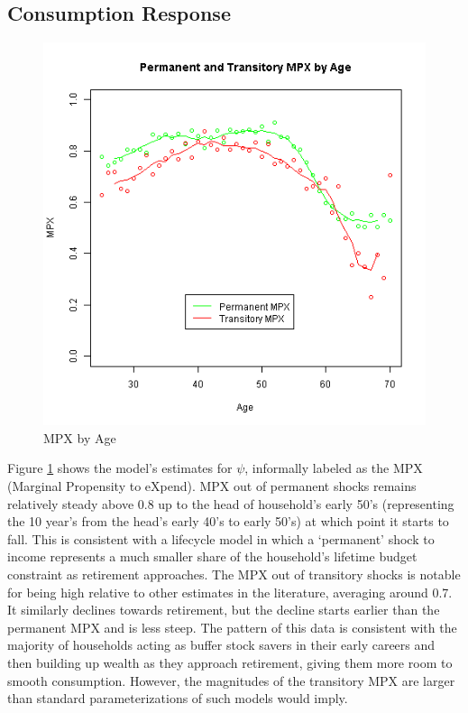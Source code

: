 \documentclass[titlepage]{\econtex}\newcommand{\texname}{IncomeUncertainty}
\begin{document}
\subsection{Consumption Response}
\begin{figure} 
	\begin{centering}
		\includegraphics[scale=0.6]{Figures/MPXByAge.png} 
		\caption{MPX by Age}
		\label{fig:MPXByAge}
	\end{centering}
\end{figure}
Figure \ref{fig:MPXByAge} shows the model's estimates for $\psi$, informally labeled as the MPX (Marginal Propensity to eXpend). MPX out of permanent shocks remains relatively steady above 0.8 up to the head of household's early 50's (representing the 10 year's from the head's early 40's to early 50's) at which point it starts to fall. This is consistent with a lifecycle model in which a `permanent' shock to income represents a much smaller share of the household's lifetime budget constraint as retirement approaches. The MPX out of transitory shocks is notable for being high relative to other estimates in the literature, averaging around 0.7. It similarly declines towards retirement, but the decline starts earlier than the permanent MPX and is less steep. The pattern of this data is consistent with the majority of households acting as buffer stock savers in their early careers and then building up wealth as they approach retirement, giving them more room to smooth consumption. However, the magnitudes of the transitory MPX are larger than standard parameterizations of such models would imply.
\end{document}
